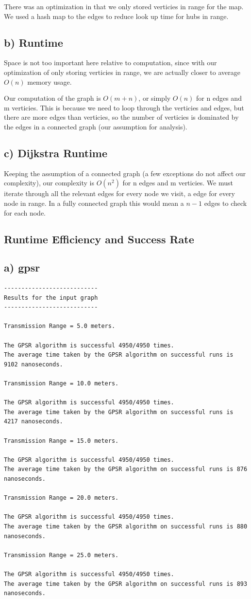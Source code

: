 \documentclass{article}
\begin{document}
There was an optimization in that we only stored verticies in range for the
map. We used a hash map to the edges to reduce look up time for hubs in range.

\subsection*{b) Runtime}
Space is not too important here relative to computation, since with our
optimization of only storing verticies in range, we are actually closer to
average $O(n)$ memory usage.

Our computation of the graph is $O(m + n)$, or simply $O(n)$ for n edges and m
verticies. This is because we need to loop through the verticies and edges,
but there are more edges than verticies, so the number of verticies is dominated
by the edges in a connected graph (our assumption for analysis).


\subsection*{c) Dijkstra Runtime}
Keeping the assumption of a connected graph (a few exceptions do not affect
our complexity), our complexity is $O(n^2)$ for n edges and m verticies. We
must iterate through all the relevant edges for every node we visit, a edge
for every node in range. In a fully connected graph this would mean a $n - 1$
edges to check for each node.

\subsection*{Runtime Efficiency and Success Rate}
\subsection*{a) gpsr}
\begin{verbatim}
---------------------------
Results for the input graph
---------------------------

Transmission Range = 5.0 meters.

The GPSR algorithm is successful 4950/4950 times.
The average time taken by the GPSR algorithm on successful runs is 9102 nanoseconds.

Transmission Range = 10.0 meters.

The GPSR algorithm is successful 4950/4950 times.
The average time taken by the GPSR algorithm on successful runs is 4217 nanoseconds.

Transmission Range = 15.0 meters.

The GPSR algorithm is successful 4950/4950 times.
The average time taken by the GPSR algorithm on successful runs is 876 nanoseconds.

Transmission Range = 20.0 meters.

The GPSR algorithm is successful 4950/4950 times.
The average time taken by the GPSR algorithm on successful runs is 880 nanoseconds.

Transmission Range = 25.0 meters.

The GPSR algorithm is successful 4950/4950 times.
The average time taken by the GPSR algorithm on successful runs is 893 nanoseconds.
\end{verbatim}
\end{document}
